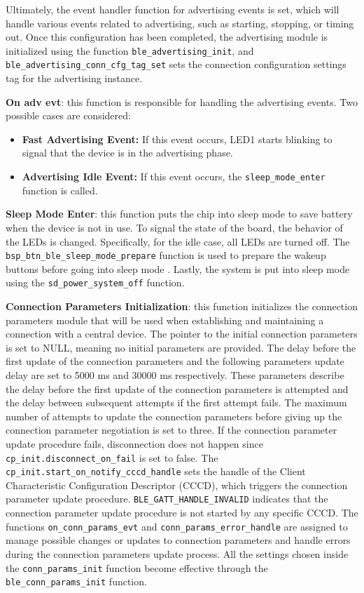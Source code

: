 \documentclass{Configuration_Files/PoliMi3i_thesis}
\begin{document}
Ultimately, the event handler function for advertising events is set, which will handle various events related to advertising, such as starting, stopping, or timing out. Once this configuration has been completed, the advertising module is initialized using the function \texttt{ble\_advertising\_init}, and \texttt{ble\_advertising\_conn\_cfg\_tag\_set} sets the connection configuration settings tag for the advertising instance.


\textbf{On adv evt}: this function is responsible for handling the advertising events. Two possible cases are considered:
\begin{itemize}
    \item \textbf{Fast Advertising Event:} If this event occurs, LED1 starts blinking to signal that the device is in the advertising phase.
    \item \textbf{Advertising Idle Event:} If this event occurs, the \texttt{sleep\_mode\_enter} function is called.
\end{itemize}

\textbf{Sleep Mode Enter}: this function puts the chip into sleep mode to save battery when the device is not in use. To signal the state of the board, the behavior of the LEDs is changed. Specifically, for the idle case, all LEDs are turned off. The \texttt{bsp\_btn\_ble\_sleep\_mode\_prepare} function is used to prepare the wakeup buttons before going into sleep mode \cite{nordic_semi}. Lastly, the system is put into sleep mode using the \texttt{sd\_power\_system\_off} function.


\textbf{Connection Parameters Initialization}: this function initializes the connection parameters module that will be used when establishing and maintaining a connection with a central device. The pointer to the initial connection parameters is set to NULL, meaning no initial parameters are provided. The delay before the first update of the connection parameters and the following parameters update delay are set to 5000 ms and 30000 ms respectively. These parameters describe the delay before the first update of the connection parameters is attempted and the delay between subsequent attempts if the first attempt fails. The maximum number of attempts to update the connection parameters before giving up the connection parameter negotiation is set to three. If the connection parameter update procedure fails, disconnection does not happen since \texttt{cp\_init.disconnect\_on\_fail} is set to false. The \texttt{cp\_init.start\_on\_notify\_cccd\_handle} sets the handle of the Client Characteristic Configuration Descriptor (CCCD), which triggers the connection parameter update procedure. \texttt{BLE\_GATT\_HANDLE\_INVALID} indicates that the connection parameter update procedure is not started by any specific CCCD. The functions \texttt{on\_conn\_params\_evt} and \texttt{conn\_params\_error\_handle} are assigned to manage possible changes or updates to connection parameters and handle errors during the connection parameters update process. All the settings chosen inside the \texttt{conn\_params\_init} function become effective through the \texttt{ble\_conn\_params\_init} function.
\end{document}
